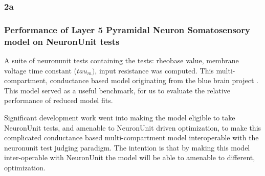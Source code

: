 \subsubsection{2a}




%
%
\subsubsection{Performance of Layer 5 Pyramidal Neuron Somatosensory model on NeuronUnit tests}
\cite{van2016bluepyopt}
A suite of neuronunit tests containing the tests: rheobase value, membrane voltage time constant ($tau_{m})$, input resistance was computed. This multi-compartment, conductance based model originating from the blue brain project \cite{markram2015reconstruction}. This model served as a useful benchmark, for us to evaluate the relative performance of reduced model fits. 




Significant development work went into making the model eligible to take NeuronUnit tests, and amenable to NeuronUnit driven optimization, to make this complicated conductance based multi-compartment model interoperable with the neuronunit test judging paradigm. The intention is that by making this model inter-operable with NeuronUnit the model will be able to amenable to different, optimization. 

